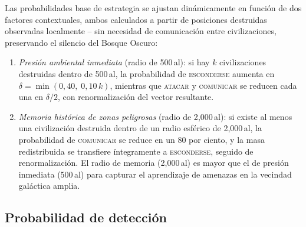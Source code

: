 \documentclass[useAMS,usenatbib,onecolumn]{mn2e}
\begin{document}
Las probabilidades base de estrategia se ajustan dinámicamente en
función de dos factores contextuales, ambos calculados a partir de
posiciones destruidas observadas localmente -- sin necesidad de
comunicación entre civilizaciones, preservando el silencio del Bosque
Oscuro:
\begin{enumerate}
  \item \emph{Presión ambiental inmediata} (radio de 500\,al):
        si hay $k$ civilizaciones destruidas dentro de 500\,al,
        la probabilidad de \textsc{esconderse} aumenta en
        $\delta = \min(0{,}40,\; 0{,}10\,k)$, mientras que
        \textsc{atacar} y \textsc{comunicar} se reducen cada una en
        $\delta/2$, con renormalización del vector resultante.
  \item \emph{Memoria histórica de zonas peligrosas} (radio de 2{,}000\,al):
        si existe al menos una civilización destruida dentro de un radio
        esférico de 2{,}000\,al, la probabilidad de \textsc{comunicar}
        se reduce en un 80 por ciento, y la masa redistribuida se
        transfiere íntegramente a \textsc{esconderse}, seguido de
        renormalización.
        El radio de memoria (2{,}000\,al) es mayor que el de presión
        inmediata (500\,al) para capturar el aprendizaje de amenazas
        en la vecindad galáctica amplia.
\end{enumerate}

\subsection{Probabilidad de detección}
\label{sec:detection}
\end{document}
